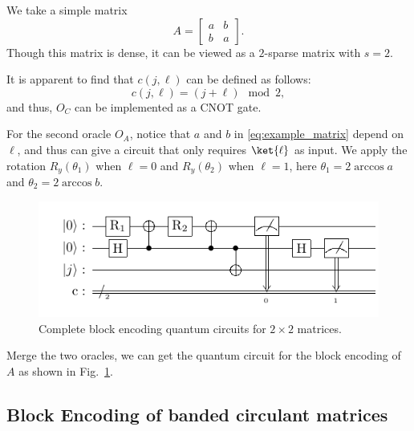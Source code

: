 \documentclass{article}
\begin{document}
    We take a simple matrix
    \begin{equation}
        A =
        \begin{bmatrix}
            a & b \\
            b & a
        \end{bmatrix}.\label{eq:example_matrix}
    \end{equation}
    Though this matrix is dense, it can be viewed as a $2$-sparse matrix with $s=2$.

    It is apparent to find that $c(j,\ell)$ can be defined as follows:
    \begin{equation}
        c(j,\ell) =(j + \ell) \mod 2,\label{eq:equation12}
    \end{equation}
    and thus, $O_C$ can be implemented as a CNOT gate.

    For the second oracle $O_A$, notice that $a$ and $b$ in \ref{eq:example_matrix} depend on $\ell$, and thus can give a circuit that only requires $\ket{\ell}$ as input. We apply the rotation $R_y(\theta_1)$ when $\ell=0$ and $R_y(\theta_2)$ when $\ell=1$, here $\theta_1 = 2\arccos a$ and $\theta_2 = 2\arccos b$.

    \begin{figure}[htbp]
        \centering
        \includegraphics{pdf/2x2_circuit}
        \caption{
            Complete block encoding quantum circuits for $2\times2$ matrices.
        }
        \label{fig:2x2_circuit}
    \end{figure}

    Merge the two oracles, we can get the quantum circuit for the block encoding of $A$ as shown in Fig.~\ref{fig:2x2_circuit}.

    \subsection{Block Encoding of banded circulant matrices}
\end{document}
